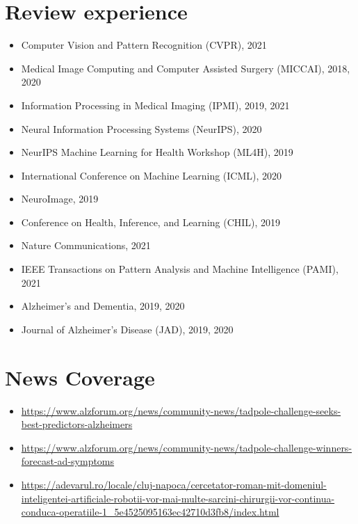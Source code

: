 \documentclass[a4paper,10pt]{article} %
\begin{document}
\section*{Review experience}
\begin{itemize}
 \item Computer Vision and Pattern Recognition (CVPR), 2021
 \item Medical Image Computing and Computer Assisted Surgery (MICCAI), 2018, 2020
 \item Information Processing in Medical Imaging (IPMI), 2019, 2021
 \item Neural Information Processing Systems (NeurIPS), 2020
 \item NeurIPS Machine Learning for Health Workshop (ML4H), 2019
 \item International Conference on Machine Learning (ICML), 2020
 \item NeuroImage, 2019
 \item Conference on Health, Inference, and Learning (CHIL), 2019
 \item Nature Communications, 2021
 \item IEEE Transactions on Pattern Analysis and Machine Intelligence (PAMI), 2021
 \item Alzheimer's and Dementia, 2019, 2020
 \item Journal of Alzheimer's Disease (JAD), 2019, 2020
\end{itemize}


\section*{News Coverage}
\begin{itemize}
 \item \url{https://www.alzforum.org/news/community-news/tadpole-challenge-seeks-best-predictors-alzheimers}
 \item \url{https://www.alzforum.org/news/community-news/tadpole-challenge-winners-forecast-ad-symptoms}
 \item \url{https://adevarul.ro/locale/cluj-napoca/cercetator-roman-mit-domeniul-inteligentei-artificiale-robotii-vor-mai-multe-sarcini-chirurgii-vor-continua-conduca-operatiile-1_5e4525095163ec42710d3fb8/index.html}
\end{itemize}
\end{document}
